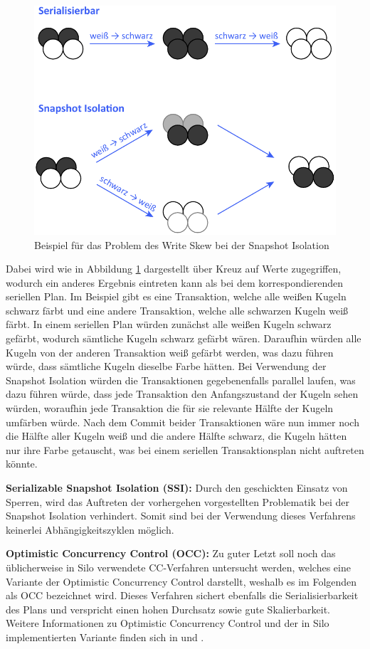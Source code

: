 \begin{figure}
	\includegraphics[width=0.8\columnwidth]{img/write_skew.pdf}
	\caption{Beispiel für das Problem des Write Skew bei der Snapshot Isolation \cite{write_skew}}
	\label{fig:write_skew}
\end{figure}

Dabei wird wie in Abbildung \ref{fig:write_skew} dargestellt über Kreuz auf Werte zugegriffen, wodurch ein anderes Ergebnis eintreten kann als bei dem korrespondierenden seriellen Plan.
Im Beispiel gibt es eine Transaktion, welche alle weißen Kugeln schwarz färbt und eine andere Transaktion, welche alle schwarzen Kugeln weiß färbt.
In einem seriellen Plan würden zunächst alle weißen Kugeln schwarz gefärbt, wodurch sämtliche Kugeln schwarz gefärbt wären.
Daraufhin würden alle Kugeln von der anderen Transaktion weiß gefärbt werden, was dazu führen würde, dass sämtliche Kugeln dieselbe Farbe hätten.
Bei Verwendung der Snapshot Isolation würden die Transaktionen gegebenenfalls parallel laufen, was dazu führen würde, dass jede Transaktion den Anfangszustand der Kugeln sehen würden, woraufhin jede Transaktion die für sie relevante Hälfte der Kugeln umfärben würde.
Nach dem Commit beider Transaktionen wäre nun immer noch die Hälfte aller Kugeln weiß und die andere Hälfte schwarz, die Kugeln hätten nur ihre Farbe getauscht, was bei einem seriellen Transaktionsplan nicht auftreten könnte.

\textbf{Serializable Snapshot Isolation (SSI):} Durch den geschickten Einsatz von Sperren, wird das Auftreten der vorhergehen vorgestellten Problematik bei der Snapshot Isolation verhindert.
Somit sind bei der Verwendung dieses Verfahrens keinerlei Abhängigkeitszyklen möglich.

\textbf{Optimistic Concurrency Control (OCC):} Zu guter Letzt soll noch das üblicherweise in Silo verwendete CC-Verfahren untersucht werden, welches eine Variante der Optimistic Concurrency Control darstellt, weshalb es im Folgenden als OCC bezeichnet wird.
Dieses Verfahren sichert ebenfalls die Serialisierbarkeit des Plans und verspricht einen hohen Durchsatz sowie gute Skalierbarkeit.
Weitere Informationen zu Optimistic Concurrency Control und der in Silo implementierten Variante finden sich in \cite{Kung:1981} und \cite{Tu:2013}.

